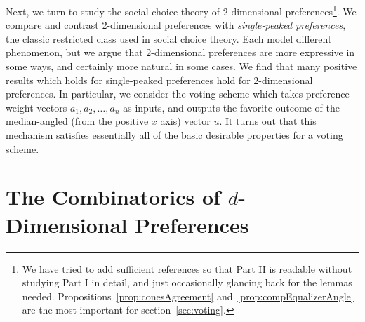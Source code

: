 \documentclass[12pt]{article}
\newcommand{\1}[1]{\mathds{1}[{#1}]}
\begin{document}
    Next, we turn to study the social choice theory of $2$-dimensional
    preferences\footnote{
      We have tried to add sufficient references so that Part II is readable
      without studying Part I in detail, and just occasionally glancing back for
      the lemmas needed.
      Propositions~\ref{prop:conesAgreement} and~\ref{prop:compEqualizerAngle}
      are the most important for section~\ref{sec:voting}.
    }. We compare and contrast $2$-dimensional preferences with 
    \emph{single-peaked preferences}, the
    classic restricted class used in social choice theory.
    Each model different phenomenon, but we argue that $2$-dimensional
    preferences are more expressive in some ways, and certainly more natural in
    some cases. We find that many positive results which holds for
    single-peaked preferences hold for $2$-dimensional preferences.
    In particular, we consider the voting scheme which takes 
    preference weight vectors $a_1,a_2,\ldots,a_n$ as inputs,
    and outputs the favorite outcome of the median-angled (from the positive $x$
    axis) vector $u$.
    It turns out that this mechanism
    satisfies essentially all of the basic desirable properties for a voting scheme.








\clearpage
\part{The Combinatorics of $d$-Dimensional Preferences}
\end{document}
